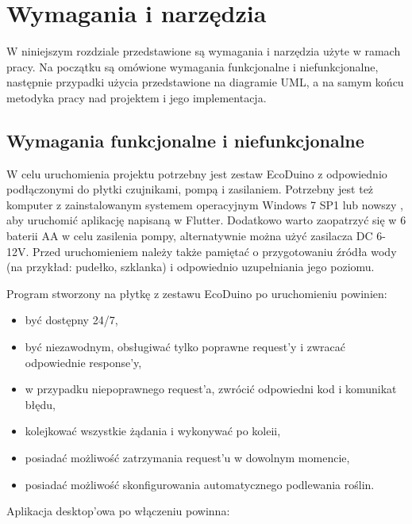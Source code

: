 \documentclass[a4paper,twoside,12pt]{book}
\begin{document}
\chapter{Wymagania i narzędzia}

W niniejszym rozdziale przedstawione są wymagania i narzędzia użyte w ramach pracy. Na początku są omówione wymagania funkcjonalne i niefunkcjonalne, następnie przypadki użycia przedstawione na diagramie UML, a na samym końcu metodyka pracy nad projektem i jego implementacja.

\section{Wymagania funkcjonalne i niefunkcjonalne}

W celu uruchomienia projektu potrzebny jest zestaw EcoDuino z odpowiednio podłączonymi do płytki czujnikami, pompą i zasilaniem. Potrzebny jest też komputer z zainstalowanym systemem operacyjnym Windows 7 SP1 lub nowszy \cite{bib:url001}, aby uruchomić aplikację napisaną w Flutter. Dodatkowo warto zaopatrzyć się w 6 baterii AA w celu zasilenia pompy, alternatywnie można użyć zasilacza DC 6-12V. Przed uruchomieniem należy także pamiętać o przygotowaniu źródła wody (na przykład: pudełko, szklanka) i odpowiednio uzupełniania jego poziomu.

Program stworzony na płytkę z zestawu EcoDuino po uruchomieniu powinien:

\begin{itemize}
   \item być dostępny 24/7,
   \item być niezawodnym, obsługiwać tylko poprawne request'y i zwracać odpowiednie response'y,
   \item w przypadku niepoprawnego request'a, zwrócić odpowiedni kod i komunikat błędu,
   \item kolejkować wszystkie żądania i wykonywać po koleii,
   \item posiadać możliwość zatrzymania request'u w dowolnym momencie,
   \item posiadać możliwość skonfigurowania automatycznego podlewania roślin.
\end{itemize}

Aplikacja desktop'owa po włączeniu powinna:
\end{document}
